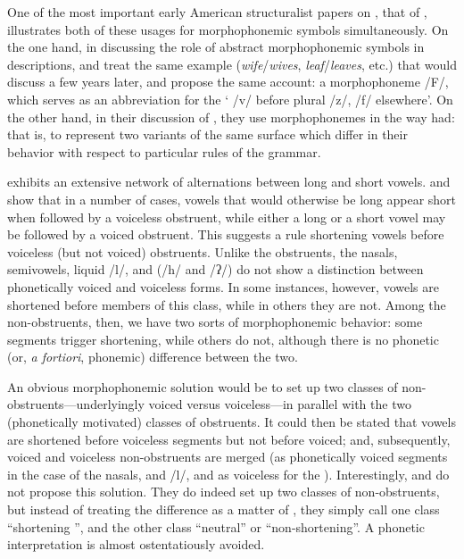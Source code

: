 One of the most important early American structuralist papers on
, that of \citet{swadesh.voegelin39:alternation},
illustrates both of these usages for morphophonemic symbols
simultaneously. On the one hand, in discussing the role of abstract
morphophonemic symbols in descriptions, {\Swadesh} and {\Voegelin} treat the
same  example (\emph{wife}/\emph{wives},
\emph{leaf}/\emph{leaves}, etc.) that {\Harris} would discuss a few years
later, and propose the same account: a morphophoneme /F/, which serves
as an abbreviation for the  ` /v/ before plural /z/,
 /f/ elsewhere'. On the other hand, in their discussion of
, they use morphophonemes in the way {\Bloomfield} had: that
is, to represent two variants of the same surface  which differ
in their behavior with respect to particular rules of the grammar.

 exhibits an extensive network of alternations between long
and short vowels. {\Swadesh} and {\Voegelin} show that in a number of cases,
vowels that would otherwise be long appear short when followed by a
voiceless obstruent, while either a long or a short vowel may be
followed by a voiced obstruent. This suggests a rule shortening vowels
before voiceless (but not voiced) obstruents. Unlike the obstruents,
the nasals, semivowels, liquid /l/, and  (/h/ and /ʔ/) do
not show a distinction between phonetically voiced and voiceless
forms. In some instances, however, vowels are shortened before members
of this class, while in others they are not. Among the non-obstruents,
then, we have two sorts of morphophonemic behavior: some segments
trigger shortening, while others do not, although there is no phonetic
(or, \emph{a fortiori}, phonemic) difference between the two.

An obvious morphophonemic solution would be to set up two classes of
non-obstruents—underlyingly voiced versus voiceless—in parallel with
the two (phonetically motivated) classes of obstruents. It could then
be stated that vowels are shortened before voiceless seg\-ments but not
before voiced; and, subsequently, voiced and voiceless non-obstruents
are merged (as phonetically voiced seg\-ments in the case of the nasals,
and /l/, and as voiceless for the ). Interestingly, {\Swadesh}
and {\Voegelin} do not propose this solution. They do indeed set up two
classes of non-obstruents, but instead of treating the difference as a
matter of , they simply call one class ``shortening
'', and the other class ``neutral'' or ``non-shortening''. A
phonetic interpretation is almost ostentatiously avoided.

